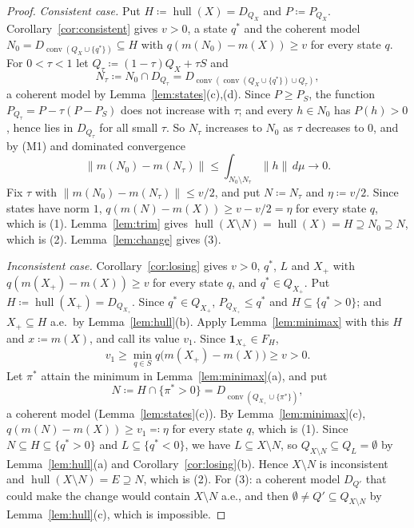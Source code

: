 \documentclass[11pt]{article}
\newcommand{\one}{\mathbf{1}}
\newcommand{\hull}{\operatorname{hull}}
\DeclareMathOperator{\conv}{conv}
\theoremstyle{plain}
\theoremstyle{definition}
\theoremstyle{remark}
\begin{document}
\begin{proof}
\emph{Consistent case.} Put $H\coloneqq\hull(X)=D_{Q_X}$ and $P\coloneqq P_{Q_X}$.
Corollary~\ref{cor:consistent} gives $v>0$, a state $q^\ast$ and the coherent model
$N_0=D_{\conv(Q_X\cup\{q^\ast\})}\subseteq H$ with $q(m(N_0)-m(X))\ge v$ for every state $q$. For
$0<\tau<1$ let $Q_\tau\coloneqq(1-\tau)Q_X+\tau S$ and
\[
  N_\tau\coloneqq N_0\cap D_{Q_\tau}=D_{\conv(\conv(Q_X\cup\{q^\ast\})\cup Q_\tau)},
\]
a coherent model by Lemma~\ref{lem:states}(c),(d). Since $P\ge P_S$, the function
$P_{Q_\tau}=P-\tau(P-P_S)$ does not increase with $\tau$; and every $h\in N_0$ has $P(h)>0$,
hence lies in $D_{Q_\tau}$ for all small $\tau$. So $N_\tau$ increases to $N_0$ as $\tau$
decreases to $0$, and by (M1) and dominated convergence
\[
  \|m(N_0)-m(N_\tau)\|\le\int_{N_0\setminus N_\tau}\|h\|\,d\mu\to0 .
\]
Fix $\tau$ with $\|m(N_0)-m(N_\tau)\|\le v/2$, and put $N\coloneqq N_\tau$ and $\eta\coloneqq
v/2$. Since states have norm $1$, $q(m(N)-m(X))\ge v-v/2=\eta$ for every state $q$, which is
(1). Lemma~\ref{lem:trim} gives $\hull(X\setminus N)=\hull(X)=H\supseteq N_0\supseteq N$, which
is (2). Lemma~\ref{lem:change} gives (3).

\emph{Inconsistent case.} Corollary~\ref{cor:losing} gives $v>0$, $q^\ast$, $L$ and $X_+$ with
$q(m(X_+)-m(X))\ge v$ for every state $q$, and $q^\ast\in Q_{X_+}$. Put $H\coloneqq\hull(X_+)=
D_{Q_{X_+}}$. Since $q^\ast\in Q_{X_+}$, $P_{Q_{X_+}}\le q^\ast$ and $H\subseteq\{q^\ast>0\}$;
and $X_+\subseteq H$ a.e.\ by Lemma~\ref{lem:hull}(b). Apply Lemma~\ref{lem:minimax} with this
$H$ and $x\coloneqq m(X)$, and call its value $v_1$. Since $\one_{X_+}\in F_H$,
\[
  v_1\ge\min_{q\in S}q\bigl(m(X_+)-m(X)\bigr)\ge v>0 .
\]
Let $\pi^\ast$ attain the minimum in Lemma~\ref{lem:minimax}(a), and put
\[
  N\coloneqq H\cap\{\pi^\ast>0\}=D_{\conv(Q_{X_+}\cup\{\pi^\ast\})},
\]
a coherent model (Lemma~\ref{lem:states}(c)). By Lemma~\ref{lem:minimax}(c), $q(m(N)-m(X))\ge
v_1\eqqcolon\eta$ for every state $q$, which is (1). Since $N\subseteq H\subseteq\{q^\ast>0\}$
and $L\subseteq\{q^\ast<0\}$, we have $L\subseteq X\setminus N$, so $Q_{X\setminus N}\subseteq
Q_L=\emptyset$ by Lemma~\ref{lem:hull}(a) and Corollary~\ref{cor:losing}(b). Hence $X\setminus
N$ is inconsistent and $\hull(X\setminus N)=E\supseteq N$, which is (2). For (3): a coherent
model $D_{Q'}$ that could make the change would contain $X\setminus N$ a.e., and then
$\emptyset\ne Q'\subseteq Q_{X\setminus N}$ by Lemma~\ref{lem:hull}(c), which is impossible.
\end{proof}
\end{document}
